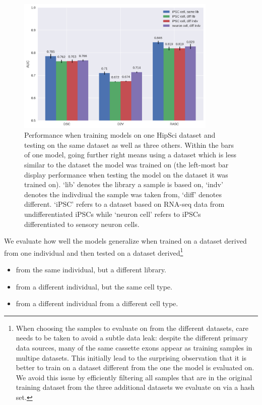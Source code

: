 \begin{figure}
	\centering\includegraphics[width=0.85\textwidth]{../visualizations/ch5-results/majiq_comparison_barcharts.png} 
	\caption{Performance when training models on one HipSci dataset and testing on the same dataset as well as three others. Within the bars of one model, going further right means using a dataset which is less similar to the dataset the model was trained on (the left-most bar display performance when testing the model on the dataset it was trained on). `lib' denotes the library a sample is based on, `indv' denotes the indivdiual the sample was taken from, `diff' denotes different. `iPSC' refers to a dataset based on RNA-seq data from undifferentiated iPSCs while `neuron cell' refers to iPSCs differentiated to sensory neuron cells. }
	\label{fig:majiq_comparison_barcharts}
\end{figure}


We evaluate how well the models generalize when trained on a dataset derived from one individual and then tested on a dataset derived\footnote{When choosing the samples to evaluate on from the different datasets, care needs to be taken to avoid a subtle data leak: despite the different primary data sources, many of the same cassette exons appear as training samples in multipe datasets. %
	This initially lead to the surprising observation that it is better to train on a dataset different from the one the model is evaluated on. We avoid this issue by efficiently filtering all samples that are in the original training dataset from the three additional datasets we evaluate on via a hash set.}
\begin{itemize}
	\item from the same individual, but a different library.
	\item from a different individual, but the same cell type.
	\item from a different individual from a different cell type.
\end{itemize}


